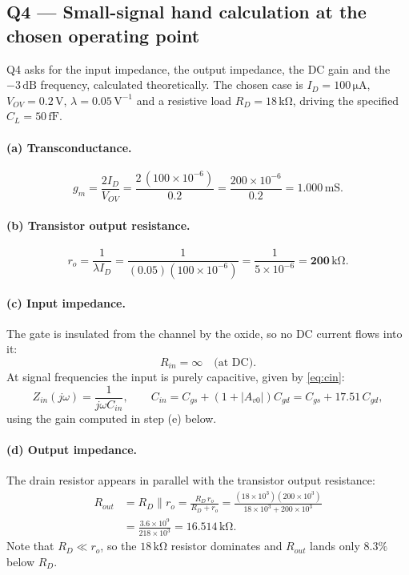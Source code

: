 \documentclass[12pt,a4paper]{article}
\newcommand{\U}[1]{\,\mathrm{#1}}
\begin{document}
\subsection{Q4 --- Small-signal hand calculation at the chosen
            operating point}\label{sec:q4}
Q4 asks for the input impedance, the output impedance, the DC gain and the
$-3\U{dB}$ frequency, calculated theoretically. The chosen case is
$I_D = 100\U{\mu A}$, $V_{OV} = 0.2\U{V}$, $\lambda = 0.05\U{V^{-1}}$ and a
resistive load $R_D = 18\U{k\Omega}$, driving the specified $C_L = 50\U{fF}$.

\paragraph{(a) Transconductance.}
\[
g_m = \frac{2 I_D}{V_{OV}}
    = \frac{2\,(100\times10^{-6})}{0.2}
    = \frac{200\times10^{-6}}{0.2}
    = \mathbf{1.000\U{mS}}.
\]

\paragraph{(b) Transistor output resistance.}
\[
r_o = \frac{1}{\lambda I_D}
    = \frac{1}{(0.05)(100\times10^{-6})}
    = \frac{1}{5\times10^{-6}}
    = \mathbf{200\U{k\Omega}}.
\]

\paragraph{(c) Input impedance.}
The gate is insulated from the channel by the oxide, so no DC current flows
into it:
\[
R_{in} = \mathbf{\infty} \quad\text{(at DC)} .
\]
At signal frequencies the input is purely capacitive, given by \eqref{eq:cin}:
\[
Z_{in}(j\omega) = \frac{1}{j\omega C_{in}},
\qquad
C_{in} = C_{gs} + (1+|A_{v0}|)C_{gd}
       = C_{gs} + 17.51\,C_{gd},
\]
using the gain computed in step (e) below.

\paragraph{(d) Output impedance.}
The drain resistor appears in parallel with the transistor output resistance:
\begin{align*}
R_{out} &= R_D \parallel r_o
         = \frac{R_D\,r_o}{R_D + r_o}
         = \frac{(18\times10^{3})(200\times10^{3})}{18\times10^{3}+200\times10^{3}}\\[2pt]
        &= \frac{3.6\times10^{9}}{218\times10^{3}}
         = \mathbf{16.514\U{k\Omega}} .
\end{align*}
Note that $R_D \ll r_o$, so the $18\U{k\Omega}$ resistor dominates and
$R_{out}$ lands only $8.3\%$ below $R_D$.
\end{document}
